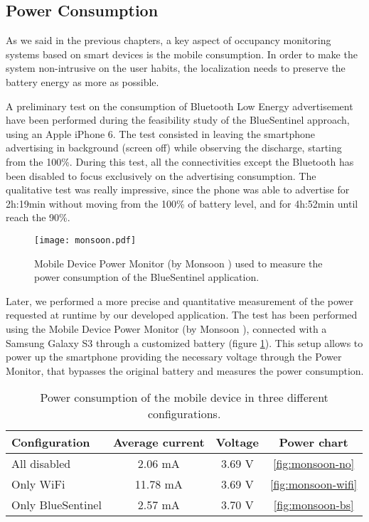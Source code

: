 \subsection{Power Consumption}
\label{sec:test-consumption}

As we said in the previous chapters, a key aspect of occupancy monitoring systems based on smart devices is the mobile consumption. In order to make the system non-intrusive on the user habits, the localization needs to preserve the battery energy as more as possible.

A preliminary test on the consumption of Bluetooth Low Energy advertisement have been performed during the feasibility study of the BlueSentinel approach, using an Apple iPhone 6. The test consisted in leaving the smartphone advertising in background (screen off) while observing the discharge, starting from the 100\%. During this test, all the connectivities except the Bluetooth has been disabled to focus exclusively on the advertising consumption. The qualitative test was really impressive, since the phone was able to advertise for 2h:19min without moving from the 100\% of battery level, and for 4h:52min until reach the 90\%.
\smallskip

\begin{figure}[h!tb]
\centering\texttt{[image: monsoon.pdf]}
\caption{Mobile Device Power Monitor (by Monsoon \textregistered) used to measure the power consumption of the BlueSentinel application.}
\label{fig:monsoon}
\end{figure}

Later, we performed a more precise and quantitative measurement of the power requested at runtime by our developed application.
The test has been performed using the Mobile Device Power Monitor (by Monsoon \textregistered), connected with a Samsung Galaxy S3 through a customized battery (figure \ref{fig:monsoon}). This setup allows to power up the smartphone providing the necessary voltage through the Power Monitor, that bypasses the original battery and measures the power consumption.


\begin{table}[h!tb]
\center
\caption{Power consumption of the mobile device in three different configurations.}
\label{tab:monsoon}
\begin{tabular}{|l|c|c|c|}
  \hline
  \textbf{Configuration} & \textbf{Average current} & \textbf{Voltage} & \textbf{Power chart}\\
  \hline
  All disabled & 2.06 mA & 3.69 V & \ref{fig:monsoon-no} \\
  Only WiFi & 11.78 mA & 3.69 V & \ref{fig:monsoon-wifi} \\
  Only BlueSentinel & 2.57 mA & 3.70 V & \ref{fig:monsoon-bs} \\
  \hline
\end{tabular}
\end{table}


